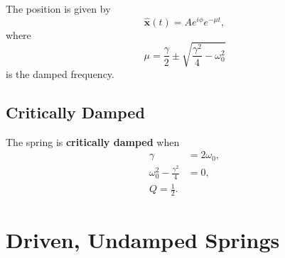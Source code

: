 The position is given by
\begin{equation}
    \boldsymbol{\hat{x}}(t) = A e^{i \phi} e^{- \mu t},
\end{equation}
where
\begin{equation}
    \mu = \frac{\gamma}{2} \pm \sqrt{\frac{\gamma^2}{4} - \omega_0^2}
\end{equation}
is the damped frequency.

\subsection{Critically Damped}

The spring is \textbf{critically damped} when
\begin{equation}
    \begin{aligned}
        \gamma                          &= 2 \omega_0, \\
        \omega_0^2 - \frac{\gamma^2}{4} &= 0, \\
        Q = \frac{1}{2}.
    \end{aligned}
\end{equation}

\section{Driven, Undamped Springs}
